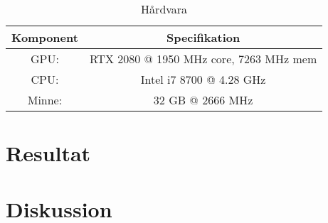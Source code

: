\documentclass[a4paper, 11pt]{article}
\begin{document}
  \begin{table}
    \centering
    \begin{tabular}{c|c}
      Komponent & Specifikation \\
      \hline
      GPU: & RTX 2080 @ 1950 MHz core, 7263 MHz mem \\
      CPU: & Intel i7 8700 @ 4.28 GHz \\
      Minne: & 32 GB @ 2666 MHz \\
    \end{tabular}
    \caption{Hårdvara}
    \label{hårdvara}
  \end{table}

  \section{Resultat}

  \section{Diskussion}


\printbibliography
\end{document}
